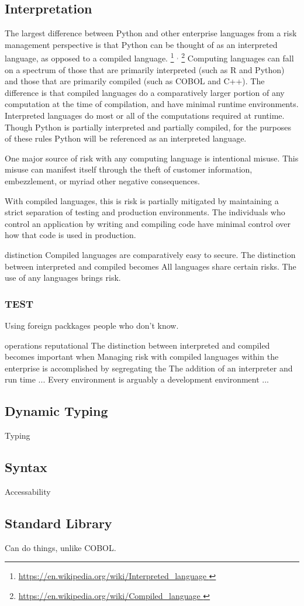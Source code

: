 	\subsection{Interpretation}
		The largest difference between Python and other enterprise languages from a risk management perspective is that Python can be thought of as an interpreted language, as opposed to a compiled language.
		\footnote{
			\url{
				https://en.wikipedia.org/wiki/Interpreted_language
			}
		}
		$^{,}$
		\footnote{
			\url{
				https://en.wikipedia.org/wiki/Compiled_language
			}
		}
		Computing languages can fall on a spectrum of those that are primarily interpreted (such as R and Python) and those that are primarily compiled (such as COBOL and C++). The difference is that compiled languages do a comparatively larger portion of any computation at the time of compilation, and have minimal runtime environments. Interpreted languages do most or all of the computations required at runtime. Though Python is partially interpreted and partially compiled, for the purposes of these rules Python will be referenced as an interpreted language.

		One major source of risk with any computing language is intentional misuse. This misuse can manifest itself through the theft of customer information, embezzlement, or myriad other negative consequences.

		With compiled languages, this is risk is partially mitigated by maintaining a strict separation of testing and production environments. The individuals who control an application by writing and compiling code have minimal control over how that code is used in production.

		distinction
		Compiled languages are comparatively easy to secure.
		The distinction between interpreted and compiled becomes 
		All languages share certain risks.
		The use of any languages brings risk. 

		\subsubsection{TEST}

		Using foreign packkages people who don't know.

	operations reputational
		The distinction between interpreted and compiled becomes important when 
		Managing risk with compiled languages within the enterprise is accomplished by segregating the 
		The addition of an interpreter and run time ...
		Every environment is arguably a development environment ...

			
	\subsection{Dynamic Typing}

		Typing

	\subsection{Syntax}

		Accessability

	\subsection{Standard Library}

		Can do things, unlike COBOL.